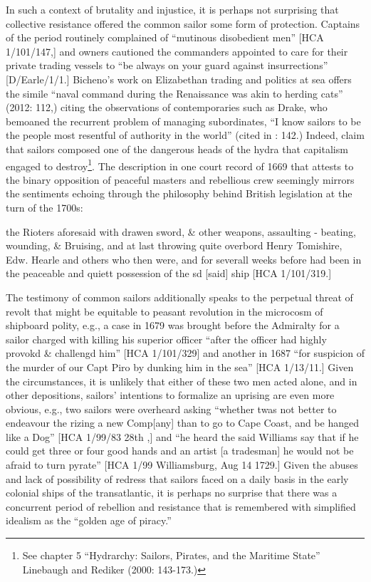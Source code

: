   In such a context of brutality and injustice, it is perhaps not surprising that collective resistance offered the common sailor some form of protection. Captains of the period routinely complained of “mutinous disobedient men” [HCA 1/101/147,] and owners cautioned the commanders appointed to care for their private trading vessels to “be always on your guard against insurrections” [D/Earle/1/1.] Bicheno’s work on Elizabethan trading and politics at sea offers the simile “naval command during the Renaissance was akin to herding cats” (2012: 112,) citing the observations of contemporaries such as Drake, who bemoaned the recurrent problem of managing subordinates, “I know sailors to be the people most resentful of authority in the world” (cited in \citealt{Bicheno2012}: 142.) Indeed, \citet{LinebaughRediker2000} claim that sailors composed one of the dangerous heads of the hydra that capitalism engaged to destroy\footnote{See chapter 5 “Hydrarchy: Sailors, Pirates, and the Maritime State” Linebaugh and Rediker (2000: 143-173.)}. The description in one court record of 1669 that attests to the binary opposition of peaceful masters and rebellious crew seemingly mirrors the sentiments echoing through the philosophy behind British legislation at the turn of the 1700s:

the Rioters aforesaid with drawen sword, \& other weapons, assaulting - beating, wounding, \& Bruising, and at last throwing quite overbord Henry Tomishire, Edw. Hearle and others who then were, and for severall weeks before had been in the peaceable and quiett possession of the sd [said] ship [HCA 1/101/319.] 

The testimony of common sailors additionally speaks to the perpetual threat of revolt that might be equitable to peasant revolution in the microcosm of shipboard polity, e.g., a case in 1679 was brought before the Admiralty for a sailor charged with killing his superior officer “after the officer had highly provokd \& challengd him” [HCA 1/101/329] and another in 1687 “for suspicion of the murder of our Capt Piro by dunking him in the sea” [HCA 1/13/11.] Given the circumstances, it is unlikely that either of these two men acted alone, and in other depositions, sailors’ intentions to formalize an uprising are even more obvious, e.g., two sailors were overheard asking “whether twas not better to endeavour the rizing a new Comp[any] than to go to Cape Coast, and be hanged like a Dog” [HCA 1/99/83 28th \citealt{March1722},] and “he heard the said Williams say that if he could get three or four good hands and an artist [a tradesman] he would not be afraid to turn pyrate” [HCA 1/99 Williamsburg, Aug 14 1729.] Given the abuses and lack of possibility of redress that sailors faced on a daily basis in the early colonial ships of the transatlantic, it is perhaps no surprise that there was a concurrent period of rebellion and resistance that is remembered with simplified idealism as the “golden age of piracy.”

